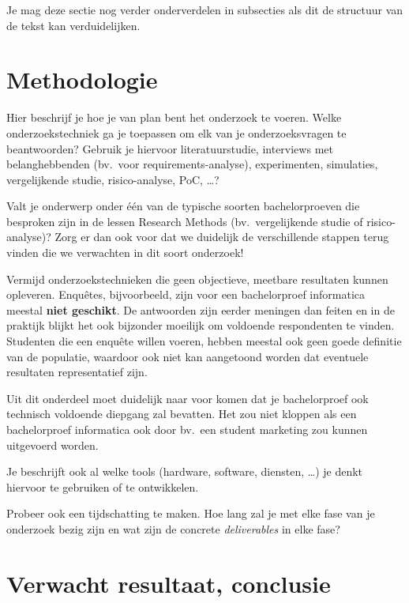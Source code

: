 Je mag deze sectie nog verder onderverdelen in subsecties als dit de structuur van de tekst kan verduidelijken.

\section{Methodologie}%
\label{sec:methodologie}

Hier beschrijf je hoe je van plan bent het onderzoek te voeren. Welke onderzoekstechniek ga je toepassen om elk van je onderzoeksvragen te beantwoorden? Gebruik je hiervoor literatuurstudie, interviews met belanghebbenden (bv.~voor requirements-analyse), experimenten, simulaties, vergelijkende studie, risico-analyse, PoC, \ldots?

Valt je onderwerp onder één van de typische soorten bachelorproeven die besproken zijn in de lessen Research Methods (bv.\ vergelijkende studie of risico-analyse)? Zorg er dan ook voor dat we duidelijk de verschillende stappen terug vinden die we verwachten in dit soort onderzoek!

Vermijd onderzoekstechnieken die geen objectieve, meetbare resultaten kunnen opleveren. Enquêtes, bijvoorbeeld, zijn voor een bachelorproef informatica meestal \textbf{niet geschikt}. De antwoorden zijn eerder meningen dan feiten en in de praktijk blijkt het ook bijzonder moeilijk om voldoende respondenten te vinden. Studenten die een enquête willen voeren, hebben meestal ook geen goede definitie van de populatie, waardoor ook niet kan aangetoond worden dat eventuele resultaten representatief zijn.

Uit dit onderdeel moet duidelijk naar voor komen dat je bachelorproef ook technisch voldoen\-de diepgang zal bevatten. Het zou niet kloppen als een bachelorproef informatica ook door bv.\ een student marketing zou kunnen uitgevoerd worden.

Je beschrijft ook al welke tools (hardware, software, diensten, \ldots) je denkt hiervoor te gebruiken of te ontwikkelen.

Probeer ook een tijdschatting te maken. Hoe lang zal je met elke fase van je onderzoek bezig zijn en wat zijn de concrete \emph{deliverables} in elke fase?

\section{Verwacht resultaat, conclusie}%
\label{sec:verwachte_resultaten}

